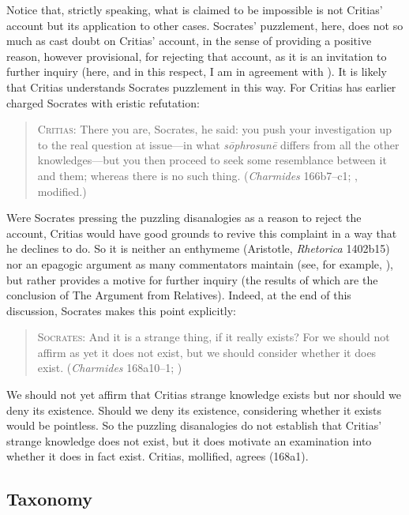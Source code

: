 Notice that, strictly speaking, what is claimed to be impossible is not Critias' account but its application to other cases. Socrates' puzzlement, here, does not so much as cast doubt on Critias' account, in the sense of providing a positive reason, however provisional, for rejecting that account, as it is an invitation to further inquiry (here, and in this respect, I am in agreement with \citealt{Politis:2008nv}). It is likely that Critias understands Socrates puzzlement in this way. For Critias has earlier charged Socrates with eristic refutation:
\begin{quote}
	\textsc{Critias}: There you are, Socrates, he said: you push your investigation up to the real question at issue—in what \emph{sōphrosunē} differs from all the other knowledges—but you then proceed to seek some resemblance between it and them; whereas there is no such thing. (\emph{Charmides} 166b7–c1; \citealt[53]{Lamb:1927qw}, modified.)
\end{quote}	
Were Socrates pressing the puzzling disanalogies as a reason to reject the account, Critias would have good grounds to revive this complaint in a way that he declines to do. So it is neither an enthymeme (Aristotle, \emph{Rhetorica} 1402b15) nor an epagogic argument as many commentators maintain (see, for example, \citealt[41]{Robinson:1941yb}), but rather provides a motive for further inquiry (the results of which are the conclusion of The Argument from Relatives). Indeed, at the end of this discussion, Socrates makes this point explicitly:
\begin{quote}
	\textsc{Socrates}: And it is a strange thing, if it really exists? For we should not affirm as yet it does not exist, but we should consider whether it does exist. (\emph{Charmides} 168a10–1; \citealt[61]{Lamb:1927qw})
\end{quote}
We should not yet affirm that Critias strange knowledge exists but nor should we deny its existence. Should we deny its existence, considering whether it exists would be pointless. So the puzzling disanalogies do not establish that Critias' strange knowledge does not exist, but it does motivate an examination into whether it does in fact exist. Critias, mollified, agrees (168a1).

\subsection{Taxonomy} %
\label{sub:taxonomy}

